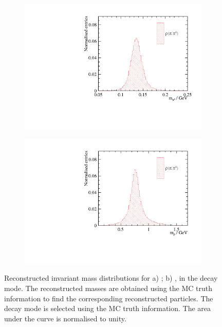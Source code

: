 \begin{figure}[htbp]
\centering
\begin{subfigure}[b]{0.45\textwidth}
 \includegraphics[width=\textwidth]{tau/mPionRhoFit_100GeV_improved_zoom.pdf}
  \caption{}
  \label{fig:tauPionFromRho}
\end{subfigure}
\begin{subfigure}[b]{0.45\textwidth}
 \includegraphics[width=\textwidth]{tau/mRhoRhoFit_100GeV_improved_zoom.pdf}
  \caption{}
  \label{fig:tauRhoFromRho}
\end{subfigure}
\caption
{Reconstructed invariant mass distributions for a) \Ppizero; b) \Prho, in the \decayRhoShort decay mode. The reconstructed masses are obtained using the MC truth information to find the corresponding reconstructed particles. The decay mode is selected using the MC truth information. The area under the curve is normalised to unity.}
\label{fig:tauRho}
\end{figure}



